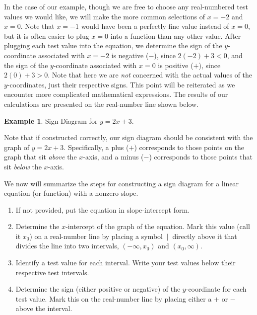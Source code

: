 \documentclass[12pt]{book}
\theoremstyle{definition}
\newtheorem{example}{Example}
\begin{document}
In the case of our example, though we are free to choose any real-numbered test values we would like, we will make the more common selections of $x=-2$ and $x=0$.  Note that $x=-1$ would have been a perfectly fine value instead of $x=0$, but it is often easier to plug $x=0$ into a function than any other value.  After plugging each test value into the equation, we determine the sign of the $y$-coordinate associated with $x=-2$ is negative ($-$), since $2(-2)+3<0$, and the sign of the $y$-coordinate associated with $x=0$ is positive ($+$), since $2(0)+3>0$.  Note that here we are {\it not} concerned with the actual values of the $y$-coordinates, just their respective signs.  This point will be reiterated as we encounter more complicated mathematical expressions.  The results of our calculations are presented on the real-number line shown below.
\begin{example}\label{Lin98} Sign Diagram for $y=2x+3$.
\begin{center}
\end{center}
\end{example} 
Note that if constructed correctly, our sign diagram should be consistent with the graph of $y=2x+3$.  Specifically, a plus ($+$) corresponds to those points on the graph that sit {\it above} the $x$-axis, and a minus ($-$) corresponds to those points that sit {\it below} the $x$-axis.\par
We now will summarize the steps for constructing a sign diagram for a linear equation (or function) with a nonzero slope.
\begin{enumerate}
	\item If not provided, put the equation in slope-intercept form.
	\item Determine the $x$-intercept of the graph of the equation.  Mark this value (call it $x_0$) on a real-number line by placing a symbol $~|~$ directly above it that divides the line into two intervals, $(-\infty,x_0)$ and $(x_0,\infty)$.
	\item Identify a test value for each interval.  Write your test values below their respective test intervals.
	\item Determine the sign (either positive or negative) of the $y$-coordinate for each test value.  Mark this on the real-number line by placing either a $+$ or $-$ above the interval.
\end{enumerate}
\end{document}
